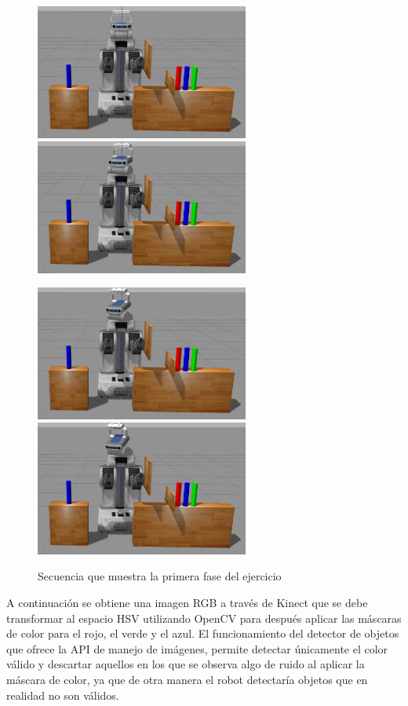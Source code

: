 \documentclass[12pt,spanish,chapterprefix, numbers=noenddot]{book}
\numberwithin{equation}{section}
\numberwithin{figure}{section}
\begin{document}
\begin{figure}[hbt!]
\centering
\includegraphics[width=7cm]{Figs/frame1.png}
\includegraphics[width=7cm]{Figs/frame161.png}
\par
\centering
\includegraphics[width=7cm]{Figs/frame195.png}
\includegraphics[width=7cm]{Figs/frame358.png}
\par
\caption{\label{fig:fase1}Secuencia que muestra la primera fase del ejercicio}
\end{figure}

A continuación se obtiene una imagen RGB a través de Kinect que se debe transformar al espacio HSV utilizando OpenCV para después aplicar las máscaras de color para el rojo, el verde y el azul. El funcionamiento del detector de objetos que ofrece la API de manejo de imágenes, permite detectar únicamente el color válido y descartar aquellos en los que se observa algo de ruido al aplicar la máscara de color, ya que de otra manera el robot detectaría objetos que en realidad no son válidos.
\end{document}
